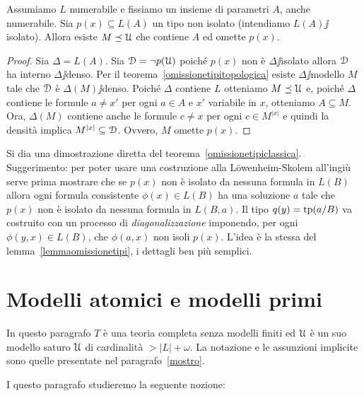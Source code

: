 \begin{theorem}\label{omissionetipiclassica}
Assumiamo $L$ numerabile e fissiamo un insieme di parametri $A$, anche numerabile. Sia $p(x)\subseteq L(A)$ un tipo non isolato (intendiamo $L(A)\jj$isolato). Allora esiste $M\preceq\EuScript U$ che contiene $A$ ed omette $p(x)$.
\end{theorem}

\begin{proof}
Sia $\Delta=L(A)$. Sia $\EuScript D=\neg p(\EuScript U)$ poich\'e $p(x)$ non \`e $\Delta\jj$isolato allora $\EuScript D$ ha interno $\Delta\jj$denso. Per il teorema~\ref{omissionetipitopologica} esiste $\Delta\jj$modello $M$ tale che $\EuScript D$ \`e $\Delta(M)\jj$denso. Poich\'e $\Delta$ contiene $L$ otteniamo $M\preceq\EuScript U$ e, poich\'e  $\Delta$ contiene le formule $a\neq x'$ per ogni $a\in A$ e $x'$ variabile in $x$, otteniamo $A\subseteq M$. Ora, $\Delta(M)$ contiene anche le formule $c\neq x$ per ogni $c\in M^{|x|}$ e quindi la densit\`a implica $M^{|x|}\subseteq\EuScript D$. Ovvero, $M$ omette $p(x)$.
\end{proof}

\begin{exercise}\label{ex_omissionetipiclassica}
Si dia una dimostrazione diretta del teorema~\ref{omissionetipiclassica}. Suggerimento: per poter usare una costruzione alla  L\"owenheim-Skolem all'ingi\`u serve prima mostrare che se $p(x)$ non \`e isolato da nessuna formula in $L(B)$ allora ogni formula consistente $\phi(x)\in L(B)$ ha una soluzione $a$ tale che $p(x)$ non \`e isolato da nessuna formula in $L(B,a)$. Il tipo $q(y)=\textrm{tp}(a/B)$ va costruito con un processo di \textit{diagonalizzazione\/} imponendo, per ogni $\phi(y,x)\in L(B)$, che $\phi(a,x)$ non isoli $p(x)$. L'idea \`e la stessa del lemma~\ref{lemmaomissionetipi}, i dettagli ben pi\`u semplici.\QED
\end{exercise}

\section{Modelli atomici e modelli primi}


In questo paragrafo $T$ \`e una teoria completa senza modelli finiti ed $\EuScript U$ \`e un suo modello saturo $\EuScript U$ di cardinalit\`a $>|L|+\omega$. La notazione e le assunzioni implicite sono quelle presentate nel paragrafo~\ref{mostro}.

I questo paragrafo studieremo la seguente nozione:

